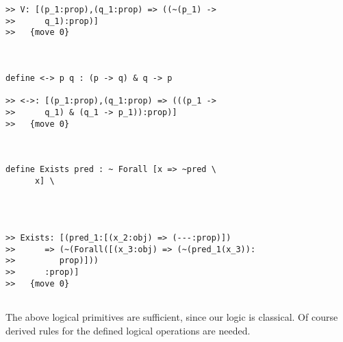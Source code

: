 \documentclass{article}
\begin{document}
\begin{verbatim}
>> V: [(p_1:prop),(q_1:prop) => ((~(p_1) ->
>>      q_1):prop)]
>>   {move 0}



define <-> p q : (p -> q) & q -> p

>> <->: [(p_1:prop),(q_1:prop) => (((p_1 ->
>>      q_1) & (q_1 -> p_1)):prop)]
>>   {move 0}



define Exists pred : ~ Forall [x => ~pred \
      x] \
   



>> Exists: [(pred_1:[(x_2:obj) => (---:prop)])
>>      => (~(Forall([(x_3:obj) => (~(pred_1(x_3)):
>>         prop)]))
>>      :prop)]
>>   {move 0}


\end{verbatim}

The above logical primitives are sufficient, since our logic is classical.  Of course derived rules for the defined
logical operations are needed.
\end{document}
